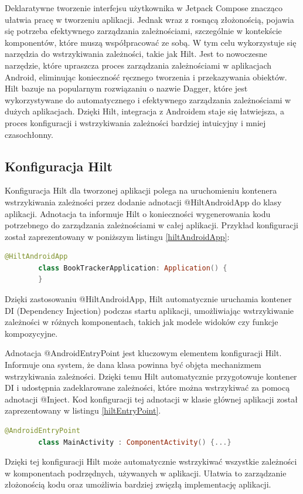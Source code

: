 \documentclass[12pt,twoside]{article}
\begin{document}
Deklaratywne tworzenie interfejsu użytkownika w Jetpack Compose znacząco ułatwia pracę w tworzeniu aplikacji. Jednak
wraz z rosnącą złożonością, pojawia się potrzeba efektywnego zarządzania zależnościami, szczególnie w kontekście 
komponentów, które muszą współpracować ze sobą. W tym celu wykorzystuje się narzędzia do wstrzykiwania zależności, 
takie jak Hilt. Jest to nowoczesne narzędzie, które upraszcza proces zarządzania zależnościami w aplikacjach Android, 
eliminując konieczność ręcznego tworzenia i przekazywania obiektów. Hilt bazuje na popularnym rozwiązaniu o nazwie 
Dagger, które jest wykorzystywane do automatycznego i efektywnego zarządzania zależnościami w dużych aplikacjach. 
Dzięki Hilt, integracja z Androidem staje się łatwiejsza, a proces konfiguracji i wstrzykiwania zależności bardziej 
intuicyjny i mniej czasochłonny.

\subsection{Konfiguracja Hilt}

Konfiguracja Hilt dla tworzonej aplikacji polega na uruchomieniu kontenera wstrzykiwania zależności przez dodanie 
adnotacji @HiltAndroidApp do klasy aplikacji. Adnotacja ta informuje Hilt o konieczności wygenerowania kodu 
potrzebnego do zarządzania zależnościami w całej aplikacji. Przykład konfiguracji został zaprezentowany w poniższym 
listingu \ref{hiltAndroidApp}:

\begin{lstlisting}[language=Kotlin,caption=Konfiguracja Hilt w aplikacji, label={hiltAndroidApp}]
	@HiltAndroidApp
		class BookTrackerApplication: Application() {
		}
\end{lstlisting}
Dzięki zastosowaniu @HiltAndroidApp, Hilt automatycznie uruchamia kontener DI (Dependency Injection) podczas startu 
aplikacji, umożliwiając wstrzykiwanie zależności w różnych komponentach, takich jak modele widoków czy funkcje 
kompozycyjne.

Adnotacja @AndroidEntryPoint jest kluczowym elementem konfiguracji Hilt. Informuje ona system, że dana klasa 
powinna być objęta mechanizmem wstrzykiwania zależności. Dzięki temu Hilt automatycznie przygotowuje kontener DI i 
udostępnia zadeklarowane zależności, które można wstrzykiwać za pomocą adnotacji @Inject. Kod konfiguracji tej 
adnotacji w klasie głównej aplikacji został zaprezentowany w listingu \ref{hiltEntryPoint}.
\begin{lstlisting}[language=Kotlin,caption=Przykład użycia @AndroidEntryPoint w MainActivity, label={hiltEntryPoint}]
	@AndroidEntryPoint
		class MainActivity : ComponentActivity() {...}
\end{lstlisting}
Dzięki tej konfiguracji Hilt może automatycznie wstrzykiwać wszystkie zależności w komponentach podrzędnych, 
używanych w aplikacji. Ułatwia to zarządzanie złożonością kodu oraz umożliwia bardziej zwięzłą implementację 
aplikacji.
\end{document}
